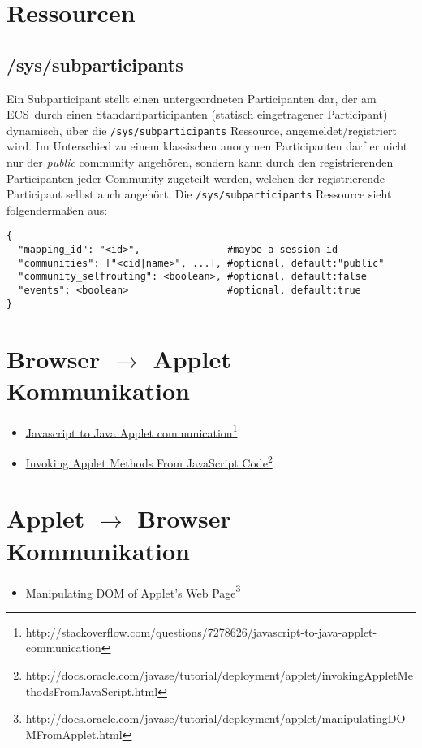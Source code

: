 \documentclass[12pt,a4paper]{article}
\newcommand{\myul}[1]{\ul{#1}}
\newcommand{\ecs}{ECS}
\newcommand{\jsToAppletComUrlA}{\mbox{http://stackoverflow.com/questions/7278626/javascript-to-java-applet-communication}}
\newcommand{\jsToAppletComUrlB}{\mbox{http://docs.oracle.com/javase/tutorial/deployment/applet/invokingAppletMethodsFromJavaScript.html}}
\newcommand{\appletToDom}{\mbox{http://docs.oracle.com/javase/tutorial/deployment/applet/manipulatingDOMFromApplet.html}}
\begin{document}
\section{Ressourcen}
\subsection{/sys/subparticipants}
Ein Subparticipant stellt einen untergeordneten Participanten dar, der am \ecs\
durch einen Standardparticipanten (statisch eingetragener Participant)
dynamisch, über die \texttt{/sys/subparticipants} Ressource,
angemeldet/registriert wird. Im Unterschied zu einem klassischen anonymen
Participanten darf er nicht nur der \textit{public} community angehören,
sondern kann durch den registrierenden Participanten jeder Community zugeteilt
werden, welchen der registrierende Participant selbst auch angehört. Die
\texttt{/sys/subparticipants} Ressource sieht folgendermaßen aus:
\begin{verbatim}
{
  "mapping_id": "<id>",               #maybe a session id
  "communities": ["<cid|name>", ...], #optional, default:"public"
  "community_selfrouting": <boolean>, #optional, default:false
  "events": <boolean>                 #optional, default:true
}
\end{verbatim}

\clearpage
\begin{appendix}
\section{Browser $\rightarrow$ Applet Kommunikation}\label{btoacom}
\begin{itemize}
  \item \href{\jsToAppletComUrlA}{\myul{Javascript to Java Applet communication}}\footnote{\jsToAppletComUrlA}
  \item \href{\jsToAppletComUrlB}{\myul{Invoking Applet Methods From JavaScript Code}}\footnote{\jsToAppletComUrlB}
\end{itemize}
\section{Applet $\rightarrow$ Browser Kommunikation}
\begin{itemize}
  \item \href{\appletToDom}{\myul{Manipulating DOM of Applet's Web Page}}\footnote{\appletToDom}
\end{itemize}
\end{appendix}
\end{document}
